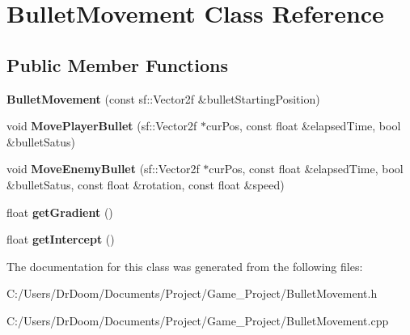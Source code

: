 \hypertarget{class_bullet_movement}{}\section{Bullet\+Movement Class Reference}
\label{class_bullet_movement}
\subsection*{Public Member Functions}
\begin{DoxyCompactItemize}
\item 
\mbox{\label{class_bullet_movement_a828d99972323657caf3dafa00e3a9e5e}} 
{\bfseries Bullet\+Movement} (const sf\+::\+Vector2f \&bullet\+Starting\+Position)
\item 
\mbox{\label{class_bullet_movement_a33b6ad498331352d366e2dab6bc2c712}} 
void {\bfseries Move\+Player\+Bullet} (sf\+::\+Vector2f $\ast$cur\+Pos, const float \&elapsed\+Time, bool \&bullet\+Satus)
\item 
\mbox{\label{class_bullet_movement_ae7109a6098374d23e8dc2360d6546b7c}} 
void {\bfseries Move\+Enemy\+Bullet} (sf\+::\+Vector2f $\ast$cur\+Pos, const float \&elapsed\+Time, bool \&bullet\+Satus, const float \&rotation, const float \&speed)
\item 
\mbox{\label{class_bullet_movement_a4dddd135a0d89dbb8d7b4ec076264f16}} 
float {\bfseries get\+Gradient} ()
\item 
\mbox{\label{class_bullet_movement_ab9716be6fffd1b7f58e5b3be24062e5b}} 
float {\bfseries get\+Intercept} ()
\end{DoxyCompactItemize}


The documentation for this class was generated from the following files\+:\begin{DoxyCompactItemize}
\item 
C\+:/\+Users/\+Dr\+Doom/\+Documents/\+Project/\+Game\+\_\+\+Project/Bullet\+Movement.\+h\item 
C\+:/\+Users/\+Dr\+Doom/\+Documents/\+Project/\+Game\+\_\+\+Project/Bullet\+Movement.\+cpp\end{DoxyCompactItemize}
